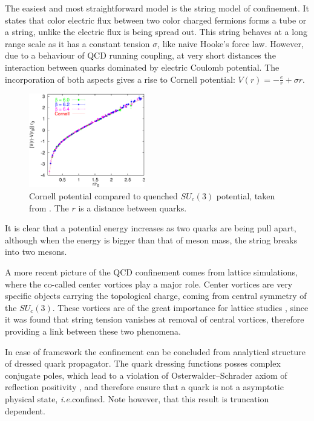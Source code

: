 The easiest and most straightforward model is the string model of confinement. It states that color electric flux between two color charged fermions forms a tube or a string, unlike the electric flux is being spread out. This string behaves at a long range scale as it has a constant tension $\sigma$, like naive Hooke's force law. However, due to a behaviour of QCD running coupling, at very short distances the interaction between quarks dominated by electric Coulomb potential. The incorporation of both aspects gives a rise to Cornell potential: $V(r) = - \frac{e}{r} + \sigma r$.
\begin{figure}[t]
\tiny
 \begin{center}
  \includegraphics[width=0.45\textwidth]{figures/cornell_V.png}
 \end{center}
 \caption{\footnotesize Cornell potential compared to quenched $SU_c(3)$ potential, taken from \cite{Bali:2000gf}. The $r$ is a distance between quarks.}\label{fig:cornell_V} 
\end{figure}
It is clear that a potential energy increases as two quarks are being pull apart, although when the energy is bigger than that of meson mass, the string breaks into two mesons.

A more recent picture of the QCD confinement comes from lattice simulations, where the co-called center vortices play a major role. Center vortices are very specific objects carrying the topological charge, coming from central symmetry of the $SU_c(3)$. These vortices are of the great importance for lattice studies \cite{'tHooft19781, PhysRevD.75.034501, Fischer:2013eca}, since it was found that string tension vanishes at removal of central vortices, therefore providing a link between these two phenomena.

In case of \DS framework the confinement can be concluded from analytical structure of dressed quark propagator. The quark dressing functions posses complex conjugate poles, which lead to a violation of Osterwalder--Schrader axiom of reflection positivity \cite{Osterwalder:1973dx}, and therefore ensure that a quark is not a asymptotic physical state, \textit{i.e.}confined. Note however, that this result is truncation dependent.


